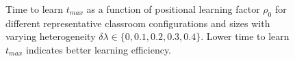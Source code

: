\begin{figure}[htbp!]
   \caption[Positional learning factor $\rho_0$ dependence of time to learn $t_{max}$ for the heterogeneous classroom model for representative SAs and heterogeneity $\delta\lambda$]{Time to learn $t_{max}$ as a function of positional learning factor $\rho_0$ for different representative classroom configurations and sizes with varying heterogeneity $\delta\lambda \in \lbrace 0, 0.1, 0.2, 0.3, 0.4 \rbrace$. Lower time to learn $t_{max}$ indicates better learning efficiency.}
   \label{fig:2DBPCAIH t-rho plot}
\end{figure}


